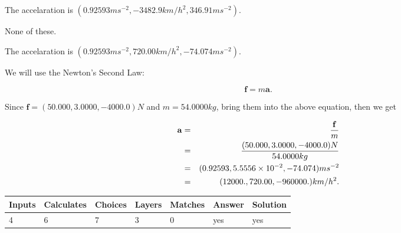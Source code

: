 \documentclass[12pt]{article}
\begin{document}
 
The accelaration is
$(
0.92593ms^{-2},
-3482.9km/h^2,
346.91ms^{-2}
).
$
 
 
 None of these.
 
 
\noindent{}
 
 
The accelaration is
$(
0.92593ms^{-2},
720.00km/h^2,
-74.074ms^{-2}
).
$
 
 
\noindent{}
 
 
 
 
 
 
\noindent{}
 
 

We will use the Newton's Second Law:
 
\[
\mathbf{f}=m\mathbf{a}.
\]
 
Since $\mathbf{f}=( %
50.000,  %
3.0000,  %
-4000.0 )N$
and $m= %
54.0000kg$, bring them into the above equation, then we get
 
\begin{eqnarray*}
\mathbf{a}&=&\frac{\mathbf{f}}m  \\
&=&\frac{(
50.000 ,
3.0000 ,
-4000.0 )N
}{ %
54.0000 kg}  \\
&=&(
0.92593 ,
5.5556 \times 10^{-2},
-74.074
)ms^{-2} \\
&=&(
12000. ,
720.00 ,
-960000.
)km/h^2.
\end{eqnarray*}
 
 
 
\noindent{}
 
 

 
\vspace{0.3in}
   
   
   
   
\noindent\begin{tabular}{|l|l|l|l|l|l|l|}
 \hline
Inputs & Calculates & Choices & Layers & Matches & Answer & Solution \\ \hline
           4  & 
           6  & 
           7
  & 
           3  & 
           0  & 
  yes & 
  yes 
  \\ \hline
 \end{tabular}
   
\end{document}
